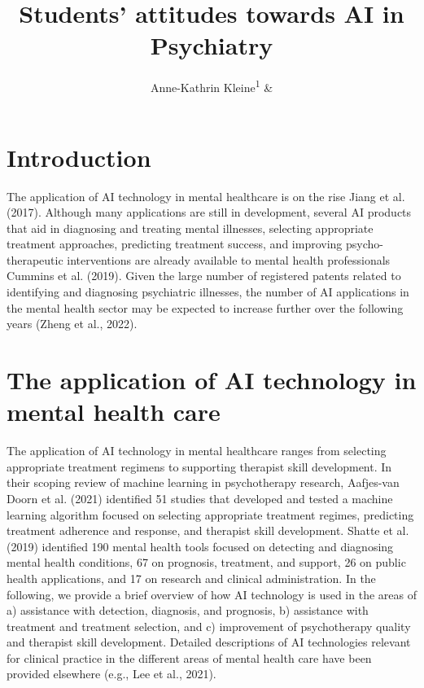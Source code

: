 \documentclass[
  man]{apa7}
\title{Students' attitudes towards AI in Psychiatry}
\author{Anne-Kathrin Kleine\textsuperscript{1} \& \textsuperscript{}}
\date{}
\affiliation{\vspace{0.5cm}\textsuperscript{1} LMU\\\textsuperscript{} }
\begin{document}
\maketitle

\hypertarget{introduction}{%
\section{Introduction}\label{introduction}}

The application of AI technology in mental healthcare is on the rise Jiang et al. (2017).
Although many applications are still in development, several AI products that aid in diagnosing and treating mental illnesses, selecting appropriate treatment approaches, predicting treatment success, and improving psycho-therapeutic interventions are already available to mental health professionals Cummins et al. (2019).
Given the large number of registered patents related to identifying and diagnosing psychiatric illnesses, the number of AI applications in the mental health sector may be expected to increase further over the following years (Zheng et al., 2022).

\hypertarget{the-application-of-ai-technology-in-mental-health-care}{%
\section{The application of AI technology in mental health care}\label{the-application-of-ai-technology-in-mental-health-care}}

The application of AI technology in mental healthcare ranges from selecting appropriate treatment regimens to supporting therapist skill development.
In their scoping review of machine learning in psychotherapy research, Aafjes-van Doorn et al. (2021) identified 51 studies that developed and tested a machine learning algorithm focused on selecting appropriate treatment regimes, predicting treatment adherence and response, and therapist skill development.
Shatte et al. (2019) identified 190 mental health tools focused on detecting and diagnosing mental health conditions, 67 on prognosis, treatment, and support, 26 on public health applications, and 17 on research and clinical administration.
In the following, we provide a brief overview of how AI technology is used in the areas of a) assistance with detection, diagnosis, and prognosis, b) assistance with treatment and treatment selection, and c) improvement of psychotherapy quality and therapist skill development.
Detailed descriptions of AI technologies relevant for clinical practice in the different areas of mental health care have been provided elsewhere (e.g., Lee et al., 2021).
\end{document}
